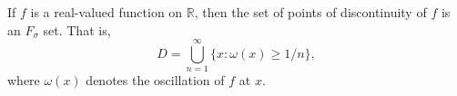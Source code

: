 If $f$ is a real-valued function on $\mathbb{R}$, then the set of points of discontinuity of $f$ is an $F_\sigma$ set. That is,
$$D = \bigcup_{n=1}^{\infty} \{x : \omega(x) \geq 1/n\},$$
where $\omega(x)$ denotes the oscillation of $f$ at $x$.
